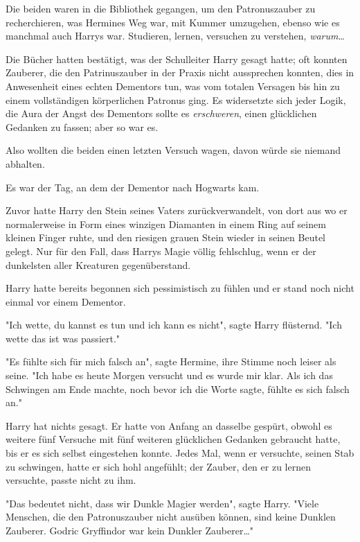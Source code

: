 {Die beiden waren in die Bibliothek gegangen, um den Patronuszauber zu recherchieren, was Hermines Weg war, mit Kummer umzugehen, ebenso wie es manchmal auch Harrys war. Studieren, lernen, versuchen zu verstehen, \emph{warum}…

Die Bücher hatten bestätigt, was der Schulleiter Harry gesagt hatte; oft konnten Zauberer, die den Patrinuszauber in der Praxis nicht aussprechen konnten, dies in Anwesenheit eines echten Dementors tun, was vom totalen Versagen bis hin zu einem vollständigen körperlichen Patronus ging. Es widersetzte sich jeder Logik, die Aura der Angst des Dementors sollte es \emph{erschweren}, einen glücklichen Gedanken zu fassen; aber so war es.

Also wollten die beiden einen letzten Versuch wagen, davon würde sie niemand abhalten.

Es war der Tag, an dem der Dementor nach Hogwarts kam.

Zuvor hatte Harry den Stein seines Vaters zurückverwandelt, von dort aus wo er normalerweise in Form eines winzigen Diamanten in einem Ring auf seinem kleinen Finger ruhte, und den riesigen grauen Stein wieder in seinen Beutel gelegt. Nur für den Fall, dass Harrys Magie völlig fehlschlug, wenn er der dunkelsten aller Kreaturen gegenüberstand.

Harry hatte bereits begonnen sich pessimistisch zu fühlen und er stand noch nicht einmal vor einem Dementor.

"Ich wette, du kannst es tun und ich kann es nicht", sagte Harry flüsternd. "Ich wette das ist was passiert."

"Es fühlte sich für mich falsch an", sagte Hermine, ihre Stimme noch leiser als seine. "Ich habe es heute Morgen versucht und es wurde mir klar. Als ich das Schwingen am Ende machte, noch bevor ich die Worte sagte, fühlte es sich falsch an."

Harry hat nichts gesagt. Er hatte von Anfang an dasselbe gespürt, obwohl es weitere fünf Versuche mit fünf weiteren glücklichen Gedanken gebraucht hatte, bis er es sich selbst eingestehen konnte. Jedes Mal, wenn er versuchte, seinen Stab zu schwingen, hatte er sich hohl angefühlt; der Zauber, den er zu lernen versuchte, passte nicht zu ihm.

"Das bedeutet nicht, dass wir Dunkle Magier werden", sagte Harry. "Viele Menschen, die den Patronuszauber nicht ausüben können, sind keine Dunklen Zauberer. Godric Gryffindor war kein Dunkler Zauberer…"

}
